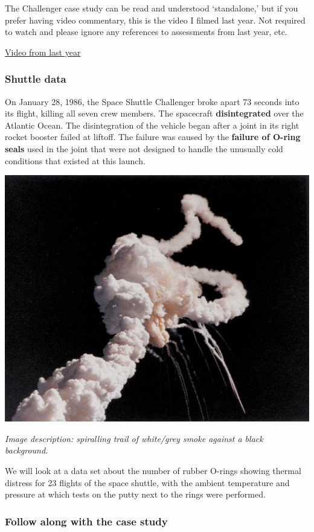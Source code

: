 \documentclass[
  openany]{book}
\begin{document}
The Challenger case study can be read and understood `standalone,' but if you prefer
having video commentary, this is the video I filmed last year. Not
required to watch and please ignore any references to assessments from
last year, etc.

\href{https://play.library.utoronto.ca/watch/90be23ecc7045074528121fafd36d5f2}{Video from last year}

\hypertarget{shuttle-data}{%
\subsubsection{Shuttle data}\label{shuttle-data}}

On January 28, 1986, the Space Shuttle Challenger broke apart 73 seconds
into its flight, killing all seven crew members. The spacecraft
\textbf{disintegrated} over the Atlantic Ocean. The disintegration of the
vehicle began after a joint in its right rocket booster failed at
liftoff. The failure was caused by the \textbf{failure of O-ring seals} used
in the joint that were not designed to handle the unusually cold
conditions that existed at this launch.

\begin{center}\includegraphics[width=0.7\linewidth]{images/m4/Challenger_explosion} \end{center}

\emph{Image description: spiralling trail of white/grey smoke against a black
background.}

We will look at a data set about the number of rubber O-rings showing
thermal distress for 23 flights of the space shuttle, with the ambient
temperature and pressure at which tests on the putty next to the rings
were performed.

\hypertarget{follow-along-with-the-case-study}{%
\subsubsection{Follow along with the case study}\label{follow-along-with-the-case-study}}
\end{document}
